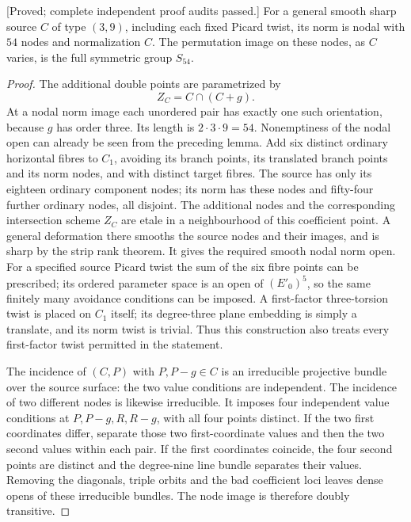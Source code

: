 \begin{lemma}
\label{lem:mixed-d3-self-node-symmetric-candidate}
\textup{[Proved; complete independent proof audits passed.]}
For a general smooth sharp source $C$ of type $(3,9)$, including
each fixed Picard twist, its norm is nodal with $54$ nodes and
normalization $C$. The permutation image on these nodes, as
$C$ varies, is the full symmetric group $S_{54}$.
\end{lemma}
\begin{proof}
The additional double points are parametrized by
\[
                   Z_C=C\cap(C+g).
\]
At a nodal norm image each unordered pair has exactly one such
orientation, because $g$ has order three. Its length is
$2\cdot3\cdot9=54$.
Nonemptiness of the nodal open can already be seen from the
preceding lemma. Add six distinct ordinary horizontal fibres
to $C_1$, avoiding its branch points, its translated branch
points and its norm nodes, and with distinct target fibres.
The source has only its eighteen ordinary component nodes;
its norm has these nodes and fifty-four further ordinary nodes,
all disjoint. The additional nodes and the corresponding
intersection scheme $Z_C$ are etale in a neighbourhood of this
coefficient point. A general deformation there smooths the
source nodes and their images, and is sharp by the strip rank
theorem. It gives the required smooth nodal norm open. For a
specified source Picard twist the sum of the six fibre points
can be prescribed; its ordered parameter space is an open of
$(E'_0)^5$, so the same finitely many avoidance conditions can
be imposed. A first-factor three-torsion twist is placed on
$C_1$ itself; its degree-three plane embedding is simply a
translate, and its norm twist is trivial. Thus this construction
also treats every first-factor twist permitted in the statement.

The incidence of $(C,P)$ with $P,P-g\in C$ is an irreducible
projective bundle over the source surface: the two value
conditions are independent. The incidence of two different
nodes is likewise irreducible. It imposes four independent
value conditions at $P,P-g,R,R-g$, with all four points
distinct. If the two first coordinates differ, separate
those two first-coordinate values and then the two second
values within each pair. If the first coordinates coincide,
the four second points are distinct and the degree-nine line
bundle separates their values. Removing the diagonals, triple
orbits and the bad coefficient loci leaves dense opens of
these irreducible bundles. The node image is therefore doubly
transitive.


\end{proof}
